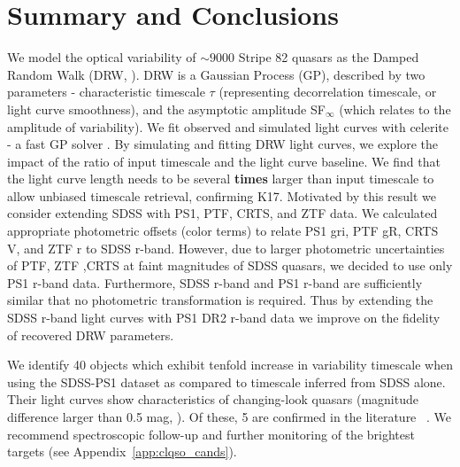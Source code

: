 \documentclass[twocolumn]{aastex62}
\newcommand{\project}[1]{\textsf{#1}}
\begin{document}
%
%
%
%

\section{Summary and Conclusions}
\label{sec:conclusions}
We model the optical variability of ${\sim} 9000$ Stripe 82 quasars as the Damped Random Walk (DRW, \citealt{kelly2009}). DRW is a Gaussian Process (GP), described by two parameters - characteristic timescale $\tau$ (representing decorrelation timescale, or light curve smoothness), and the asymptotic amplitude SF$_{\infty}$ (which relates to the amplitude of variability). We fit observed and simulated light curves with \project{celerite} - a fast GP solver \citep{foreman2017}. By simulating and fitting DRW light curves, we explore the impact of the ratio of input timescale and the light curve baseline. We find that the light curve length needs to be several \textbf{times} larger than input timescale to allow unbiased timescale retrieval, confirming K17. Motivated by this result we consider extending SDSS with PS1, PTF, CRTS, and ZTF data.  We calculated appropriate photometric offsets (color terms) to relate PS1 gri, PTF gR,  CRTS V, and ZTF r to SDSS r-band. However, due to larger photometric uncertainties of PTF, ZTF ,CRTS at faint magnitudes of SDSS quasars, we decided to use only PS1 r-band data. Furthermore, SDSS r-band and PS1 r-band are sufficiently similar that no photometric transformation is required.  Thus by extending the SDSS r-band light curves with PS1 DR2 r-band data we improve on the fidelity of recovered DRW parameters. 

We identify 40 objects which exhibit tenfold increase in variability timescale when using the SDSS-PS1 dataset as compared to timescale inferred from SDSS alone. Their light curves show characteristics of changing-look quasars (magnitude difference larger than 0.5 mag, \citealt{macleod2016}). Of these, 5 are confirmed in the literature ~\citep{macleod2019, lamassa2015}. We recommend spectroscopic follow-up and further monitoring of the brightest targets (see Appendix~\ref{app:clqso_cands}).
\end{document}
